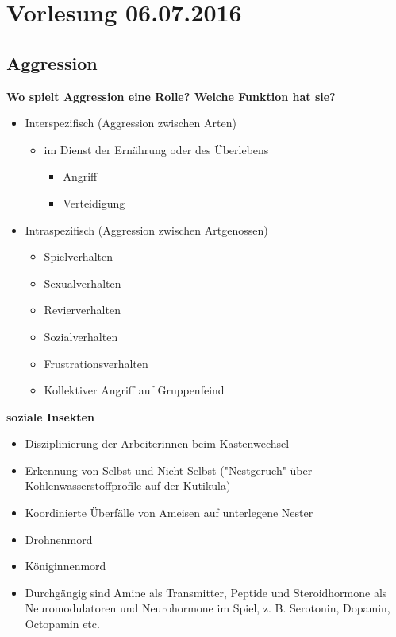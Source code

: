 \section{Vorlesung 06.07.2016}

\subsection{Aggression}

\textbf{Wo spielt Aggression eine Rolle? Welche Funktion hat sie?}\\
\begin{itemize}
	\item Interspezifisch (Aggression zwischen Arten)
	\begin{itemize}
		\item im Dienst der Ernährung oder des Überlebens
		\begin{itemize}
			\item Angriff
			\item Verteidigung
		\end{itemize}
	\end{itemize}
	\item Intraspezifisch (Aggression zwischen Artgenossen)
	\begin{itemize}
		\item Spielverhalten
		\item Sexualverhalten
		\item Revierverhalten
		\item Sozialverhalten
		\item Frustrationsverhalten
		\item Kollektiver Angriff auf Gruppenfeind
	\end{itemize}
\end{itemize}

\textbf{soziale Insekten}
\begin{itemize}
	\item Disziplinierung der Arbeiterinnen beim Kastenwechsel
	\item Erkennung von Selbst und Nicht-Selbst ("Nestgeruch" über Kohlenwasserstoffprofile auf der Kutikula)
	\item Koordinierte Überfälle von Ameisen auf unterlegene Nester
	\item Drohnenmord
	\item Königinnenmord
	\item Durchgängig sind Amine als Transmitter, Peptide und Steroidhormone als Neuromodulatoren und Neurohormone im Spiel, z. B. Serotonin, Dopamin, Octopamin etc.
\end{itemize}


